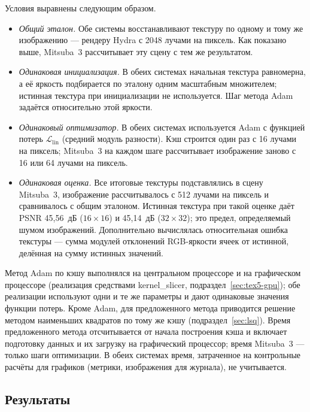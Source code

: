 Условия выравнены следующим образом.
\begin{itemize}
    \item \emph{Общий эталон.} Обе системы восстанавливают текстуру по одному и тому же изображению --- рендеру Hydra с 2048 лучами на пиксель. Как показано выше, Mitsuba~3 рассчитывает эту сцену с тем же результатом.
    \item \emph{Одинаковая инициализация.} В обеих системах начальная текстура равномерна, а её яркость подбирается по эталону одним масштабным множителем; истинная текстура при инициализации не используется. Шаг метода Adam задаётся относительно этой яркости.
    \item \emph{Одинаковый оптимизатор.} В обеих системах используется Adam с функцией потерь $\mathcal{L}_{\mathrm{lin}}$ (средний модуль разности). Кэш строится один раз с 16 лучами на пиксель; Mitsuba~3 на каждом шаге рассчитывает изображение заново с 16 или 64 лучами на пиксель.
    \item \emph{Одинаковая оценка.} Все итоговые текстуры подставлялись в сцену Mitsuba~3, изображение рассчитывалось с 512 лучами на пиксель и сравнивалось с общим эталоном. Истинная текстура при такой оценке даёт PSNR 45,56~дБ ($16\times16$) и 45,14~дБ ($32\times32$); это предел, определяемый шумом изображений. Дополнительно вычислялась относительная ошибка текстуры --- сумма модулей отклонений RGB-яркости ячеек от истинной, делённая на сумму истинных значений.
\end{itemize}
Метод Adam по кэшу выполнялся на центральном процессоре и на графическом процессоре (реализация средствами kernel\_slicer, подраздел~\ref{sec:tex5-gpu}); обе реализации используют одни и те же параметры и дают одинаковые значения функции потерь. Кроме Adam, для предложенного метода приводится решение методом наименьших квадратов по тому же кэшу (подраздел~\ref{sec:lsq}). Время предложенного метода отсчитывается от начала построения кэша и включает подготовку данных и их загрузку на графический процессор; время Mitsuba~3 --- только шаги оптимизации. В обеих системах время, затраченное на контрольные расчёты для графиков (метрики, изображения для журнала), не учитывается.

\subsection{Результаты}

